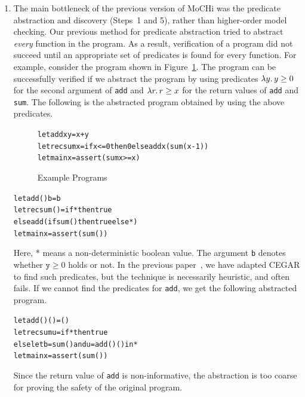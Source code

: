 \begin{enumerate}
\item The main bottleneck of the previous version of MoCHi was the
      predicate abstraction and discovery (Steps~1 and 5), rather than
      higher-order model checking.  Our previous method for predicate
      abstraction tried to abstract \emph{every} function in the
      program. As a result, verification of a program did not succeed
      until an appropriate set of predicates is found for every
      function.  For example, consider the program shown in
      Figure~\ref{fig:sum}.  The program can be successfully verified if
      we abstract the program by using predicates $\lambda{y}.\,{y \geq 0}$
      for the second argument of \texttt{add} and $\lambda{r}.\,{r \geq x}$
      for the return values of \texttt{add} and \texttt{sum}.  The
      following is the abstracted program obtained 
  by using the above predicates.
\begin{figure}[t]
\vspace{-5pt}
\begin{alltt}
 let add x y = x + y
 letrec sum x = if x<=0 then 0 else add x (sum(x-1))
 let main x = assert (sum x >= x)
\end{alltt}
\vspace{-5pt}
\caption{Example Programs}
\label{fig:sum}
\end{figure}
\vspace{-5pt}
\begin{alltt}
 let add () b = b
 letrec sum () = if * then true
   else add (if sum () then true else *)
 let main x = assert (sum ())
\end{alltt}
\vspace{-5pt}
      Here, * means a non-deterministic boolean value.  The argument
      \texttt{b} denotes whether $\mathtt{y} \geq 0$ holds or not.
      In the previous paper~\cite{KobayashiPLDI2011}, we have adapted
      CEGAR to find such predicates, but the technique is necessarily
      heuristic, and often fails.  If we cannot find the
      predicates for \texttt{add}, we get the following abstracted
      program.
\vspace{-5pt}
\begin{alltt}
 let add () () = ()
 letrec sum u = if * then true
   else let b = sum () and u = add () () in *
 let main x = assert (sum ())
\end{alltt}
\vspace{-5pt}
      Since the return value of \texttt{add} is non-informative, the
      abstraction is too coarse for proving the safety of the original program.


\end{enumerate}
